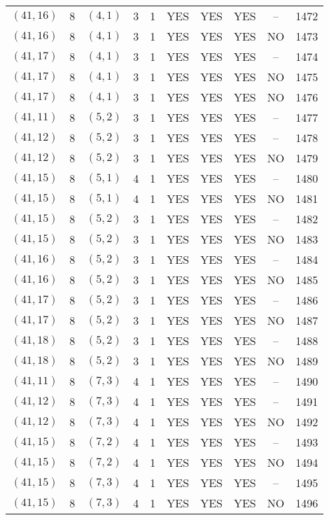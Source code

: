 \begin{longtable}{|c|c|c|c|c|c|c|c|c|c|}
$(41, 16)$ & 8 & $(4, 1)$ & 3 & 1 & YES & YES & YES & -- & 1472\\
$(41, 16)$ & 8 & $(4, 1)$ & 3 & 1 & YES & YES & YES & NO & 1473\\
$(41, 17)$ & 8 & $(4, 1)$ & 3 & 1 & YES & YES & YES & -- & 1474\\
$(41, 17)$ & 8 & $(4, 1)$ & 3 & 1 & YES & YES & YES & NO & 1475\\
$(41, 17)$ & 8 & $(4, 1)$ & 3 & 1 & YES & YES & YES & NO & 1476\\
$(41, 11)$ & 8 & $(5, 2)$ & 3 & 1 & YES & YES & YES & -- & 1477\\
$(41, 12)$ & 8 & $(5, 2)$ & 3 & 1 & YES & YES & YES & -- & 1478\\
$(41, 12)$ & 8 & $(5, 2)$ & 3 & 1 & YES & YES & YES & NO & 1479\\
$(41, 15)$ & 8 & $(5, 1)$ & 4 & 1 & YES & YES & YES & -- & 1480\\
$(41, 15)$ & 8 & $(5, 1)$ & 4 & 1 & YES & YES & YES & NO & 1481\\
$(41, 15)$ & 8 & $(5, 2)$ & 3 & 1 & YES & YES & YES & -- & 1482\\
$(41, 15)$ & 8 & $(5, 2)$ & 3 & 1 & YES & YES & YES & NO & 1483\\
$(41, 16)$ & 8 & $(5, 2)$ & 3 & 1 & YES & YES & YES & -- & 1484\\
$(41, 16)$ & 8 & $(5, 2)$ & 3 & 1 & YES & YES & YES & NO & 1485\\
$(41, 17)$ & 8 & $(5, 2)$ & 3 & 1 & YES & YES & YES & -- & 1486\\
$(41, 17)$ & 8 & $(5, 2)$ & 3 & 1 & YES & YES & YES & NO & 1487\\
$(41, 18)$ & 8 & $(5, 2)$ & 3 & 1 & YES & YES & YES & -- & 1488\\
$(41, 18)$ & 8 & $(5, 2)$ & 3 & 1 & YES & YES & YES & NO & 1489\\
$(41, 11)$ & 8 & $(7, 3)$ & 4 & 1 & YES & YES & YES & -- & 1490\\
$(41, 12)$ & 8 & $(7, 3)$ & 4 & 1 & YES & YES & YES & -- & 1491\\
$(41, 12)$ & 8 & $(7, 3)$ & 4 & 1 & YES & YES & YES & NO & 1492\\
$(41, 15)$ & 8 & $(7, 2)$ & 4 & 1 & YES & YES & YES & -- & 1493\\
$(41, 15)$ & 8 & $(7, 2)$ & 4 & 1 & YES & YES & YES & NO & 1494\\
$(41, 15)$ & 8 & $(7, 3)$ & 4 & 1 & YES & YES & YES & -- & 1495\\
$(41, 15)$ & 8 & $(7, 3)$ & 4 & 1 & YES & YES & YES & NO & 1496\\

\end{longtable}
